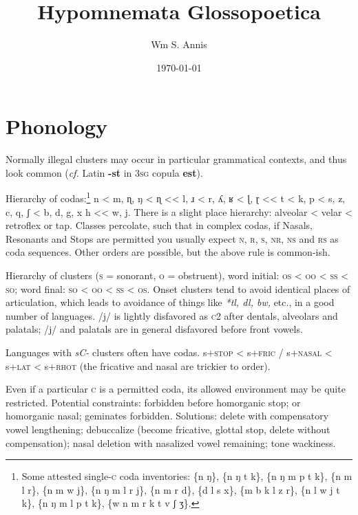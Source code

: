\documentclass[11pt]{article}
\newcommand{\LL}[1]{\textbf{#1}}  %
\newcommand{\I}[1]{\textsc{#1}}   %
\begin{document}
\frenchspacing
\title{Hypomnemata Glossopoetica}
\author{Wm S. Annis}
\date{\today}
\maketitle

\section{Phonology}

Normally illegal clusters may occur in particular grammatical
contexts, and thus look common (\textit{cf.} Latin \LL{-st} in \I{3sg}
copula \LL{est}).

Hierarchy of codas:\footnote{Some attested single-\I{c} coda
  inventories: \{n ŋ\}, \{n ŋ t k\}, \{n ŋ m p t k\}, \{n m l r\}, \{n
  m w j\}, \{n ŋ m l r j\}, \{n m r d\}, \{d l s x\}, \{m b k l z r\},
  \{n l w j t k\}, \{n ŋ m l p t k\}, \{w n m r k t v ʃ ʒ\}.} n < m,
ɳ, ŋ < ɳ << l, ɹ < r, ʎ, ʁ < ɭ, ɽ << t < k, p < s, z, c, q, ʃ < b, d,
g, x h << w, j.  There is a slight place hierarchy: alveolar < velar <
retroflex or tap.  Classes percolate, such that in complex codas, if
Nasals, Resonants and Stops are permitted you usually expect \I{n, r,
  s, nr, ns} and \I{rs} as coda sequences.  Other orders are possible,
but the above rule is common-ish.

Hierarchy of clusters (\I{s} = sonorant, \I{o} = obstruent), word
initial: \I{os} < \I{oo} < \I{ss} < \I{so}; word final: \I{so} <
\I{oo} < \I{ss} < \I{os}.  Onset clusters tend to avoid identical
places of articulation, which leads to avoidance of things like
\textit{*tl, dl, bw,} etc., in a good number of languages. /j/ is
lightly disfavored as \I{c2} after dentals, alveolars and palatals;
/j/ and palatals are in general disfavored before front vowels.

Languages with \textit{sC-} clusters often have codas.  s+\I{stop} <
s+\I{fric} / s+\I{nasal} < s+\I{lat} < s+\I{rhot} (the fricative and
nasal are trickier to order).

Even if a particular \I{c} is a permitted coda, its allowed
environment may be quite restricted. Potential constraints: forbidden
before homorganic stop; or homorganic nasal; geminates
forbidden. Solutions: delete with compensatory vowel lengthening;
debuccalize (become fricative, glottal stop, delete without
compensation); nasal deletion with nasalized vowel remaining;
tone wackiness.
\end{document}
